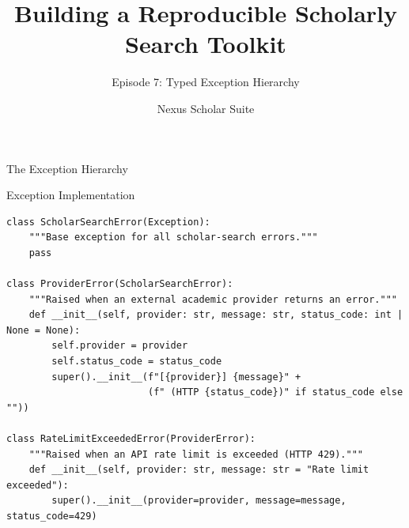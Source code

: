 \documentclass[aspectratio=169]{beamer}
\title{Building a Reproducible Scholarly Search Toolkit}
\subtitle{Episode 7: Typed Exception Hierarchy}
\author{Nexus Scholar Suite}
\date{}
\begin{document}
\begin{frame}[plain]
  \titlepage
\end{frame}

\begin{frame}{The Exception Hierarchy}
  \begin{center}
  \end{center}
\end{frame}

\begin{frame}[fragile]{Exception Implementation}
\begin{lstlisting}[style=nexuspython]
class ScholarSearchError(Exception):
    """Base exception for all scholar-search errors."""
    pass

class ProviderError(ScholarSearchError):
    """Raised when an external academic provider returns an error."""
    def __init__(self, provider: str, message: str, status_code: int | None = None):
        self.provider = provider
        self.status_code = status_code
        super().__init__(f"[{provider}] {message}" + 
                         (f" (HTTP {status_code})" if status_code else ""))

class RateLimitExceededError(ProviderError):
    """Raised when an API rate limit is exceeded (HTTP 429)."""
    def __init__(self, provider: str, message: str = "Rate limit exceeded"):
        super().__init__(provider=provider, message=message, status_code=429)
\end{lstlisting}
\end{frame}
\end{document}
